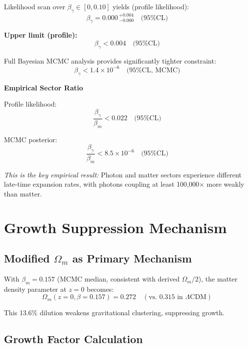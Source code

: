 \documentclass[twocolumn,superscriptaddress,prl,amsmath,amssymb]{revtex4-2}
\begin{document}
Likelihood scan over $\beta_\gamma \in [0, 0.10]$ yields (profile likelihood):
\begin{equation}
\beta_\gamma = 0.000\,^{+0.004}_{-0.000} \quad \text{(95\% CL)}
\end{equation}

\textbf{Upper limit (profile):}
\begin{equation}
\beta_\gamma < 0.004 \quad \text{(95\% CL)}
\end{equation}

Full Bayesian MCMC analysis provides significantly tighter constraint:
\begin{equation}
\beta_\gamma < 1.4 \times 10^{-6} \quad \text{(95\% CL, MCMC)}
\end{equation}

\textbf{Empirical Sector Ratio}

Profile likelihood:
\begin{equation}
\frac{\beta_\gamma}{\beta_m} < 0.022 \quad \text{(95\% CL)}
\end{equation}

MCMC posterior:
\begin{equation}
\frac{\beta_\gamma}{\beta_m} < 8.5 \times 10^{-6} \quad \text{(95\% CL)}
\label{eq:sector_ratio}
\end{equation}

\textit{This is the key empirical result:} Photon and matter sectors experience different late-time expansion rates, with photons coupling at least 100,000$\times$ more weakly than matter.

\section{Growth Suppression Mechanism}

\subsection{Modified $\Omega_m$ as Primary Mechanism}

With $\beta_m = 0.157$ (MCMC median, consistent with derived $\Omega_m/2$), the matter density parameter at $z=0$ becomes:
\begin{equation}
\Omega_m(z=0, \beta=0.157) = 0.272 \quad (\text{vs. } 0.315 \text{ in } \Lambda\text{CDM})
\end{equation}

This 13.6\% dilution weakens gravitational clustering, suppressing growth.

\subsection{Growth Factor Calculation}
\end{document}
